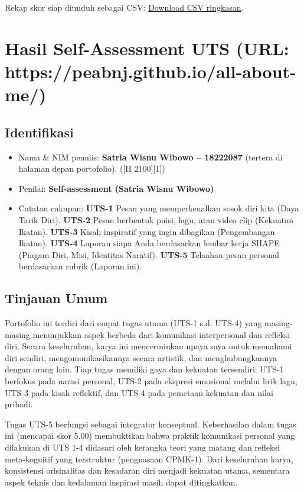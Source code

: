 \documentclass[
  letterpaper,
  DIV=11,
  numbers=noendperiod]{scrreprt}
\providecommand{\tightlist}{%
  \setlength{\itemsep}{0pt}\setlength{\parskip}{0pt}}
\begin{document}
Rekap skor siap diunduh sebagai CSV:
\href{sandbox:/mnt/data/rekap_UTS.csv}{Download CSV ringkasan}.


\chapter{Hasil Self-Assessment UTS (URL:
https://peabnj.github.io/all-about-me/)}\label{hasil-self-assessment-uts-url-httpspeabnj.github.ioall-about-me}

\section{Identifikasi}\label{identifikasi}

\begin{itemize}
\tightlist
\item
  Nama \& NIM penulis: \textbf{Satria Wisnu Wibowo -- 18222087} (tertera
  di halaman depan portofolio). ({[}II 2100{]}{[}1{]})
\item
  Penilai: \textbf{Self-assessment (Satria Wisnu Wibowo)}
\item
  Catatan cakupan: \textbf{UTS-1} Pesan yang memperkenalkan sosok diri
  kita (Daya Tarik Diri). \textbf{UTS-2} Pesan berbentuk puisi, lagu,
  atau video clip (Kekuatan Ikatan). \textbf{UTS-3} Kisah inspiratif
  yang ingin dibagikan (Pengembangan Ikatan). \textbf{UTS-4} Laporan
  siapa Anda berdasarkan lembar kerja SHAPE (Piagam Diri, Misi,
  Identitas Naratif). \textbf{UTS-5} Telaahan pesan personal berdasarkan
  rubrik (Laporan ini).
\end{itemize}

\section{Tinjauan Umum}\label{tinjauan-umum}

Portofolio ini terdiri dari empat tugas utama (UTS-1 s.d. UTS-4) yang
masing-masing menunjukkan aspek berbeda dari komunikasi interpersonal
dan refleksi diri. Secara keseluruhan, karya ini mencerminkan upaya saya
untuk memahami diri sendiri, mengomunikasikannya secara artistik, dan
menghubungkannya dengan orang lain. Tiap tugas memiliki gaya dan
kekuatan tersendiri: UTS-1 berfokus pada narasi personal, UTS-2 pada
ekspresi emosional melalui lirik lagu, UTS-3 pada kisah reflektif, dan
UTS-4 pada pemetaan kekuatan dan nilai pribadi.

Tugas UTS-5 berfungsi sebagai integrator konseptual. Keberhasilan dalam
tugas ini (mencapai skor 5.00) membuktikan bahwa praktik komunikasi
personal yang dilakukan di UTS 1-4 didasari oleh kerangka teori yang
matang dan refleksi meta-kognitif yang terstruktur (penguasaan CPMK-1).
Dari keseluruhan karya, konsistensi orisinalitas dan kesadaran diri
menjadi kekuatan utama, sementara aspek teknis dan kedalaman inspirasi
masih dapat ditingkatkan.
\end{document}
